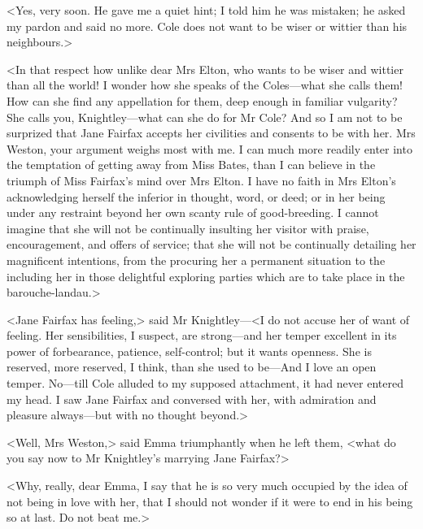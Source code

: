 <Yes, very soon. He gave me a quiet hint; I told him he was mistaken; he asked my pardon and said no more. Cole does not want to be wiser or wittier than his neighbours.>

<In that respect how unlike dear Mrs Elton, who wants to be wiser and wittier than all the world! I wonder how she speaks of the Coles—what she calls them! How can she find any appellation for them, deep enough in familiar vulgarity? She calls you, Knightley—what can she do for Mr Cole? And so I am not to be surprized that Jane Fairfax accepts her civilities and consents to be with her. Mrs Weston, your argument weighs most with me. I can much more readily enter into the temptation of getting away from Miss Bates, than I can believe in the triumph of Miss Fairfax's mind over Mrs Elton. I have no faith in Mrs Elton's acknowledging herself the inferior in thought, word, or deed; or in her being under any restraint beyond her own scanty rule of good-breeding. I cannot imagine that she will not be continually insulting her visitor with praise, encouragement, and offers of service; that she will not be continually detailing her magnificent intentions, from the procuring her a permanent situation to the including her in those delightful exploring parties which are to take place in the barouche-landau.>

<Jane Fairfax has feeling,> said Mr Knightley—<I do not accuse her of want of feeling. Her sensibilities, I suspect, are strong—and her temper excellent in its power of forbearance, patience, self-control; but it wants openness. She is reserved, more reserved, I think, than she used to be—And I love an open temper. No—till Cole alluded to my supposed attachment, it had never entered my head. I saw Jane Fairfax and conversed with her, with admiration and pleasure always—but with no thought beyond.>

<Well, Mrs Weston,> said Emma triumphantly when he left them, <what do you say now to Mr Knightley's marrying Jane Fairfax?>

<Why, really, dear Emma, I say that he is so very much occupied by the idea of not being in love with her, that I should not wonder if it were to end in his being so at last. Do not beat me.>